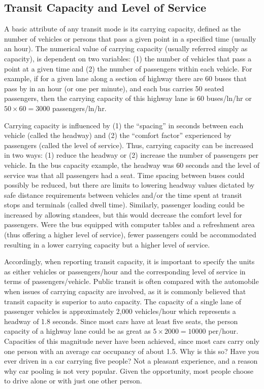 \subsection{Transit Capacity and Level of Service}
A basic attribute of any transit mode is its carrying capacity, defined as the number of vehicles or persons that pass a given point in a specified time (usually an hour). The numerical value of carrying capacity (usually referred simply as capacity), is dependent on two variables: (1) the number of vehicles that pass a point at a given time and (2) the number of passengers within each vehicle. For example, if for a given lane along a section of highway there are 60 buses that pass by in an hour (or one per minute), and each bus carries 50 seated passengers, then the carrying capacity of this highway lane is 60 buses/ln/hr or $50 \times 60 = 3000$ passengers/ln/hr.\\
\par
Carrying capacity is influenced by (1) the “spacing” in seconds between each
vehicle (called the headway) and (2) the “comfort factor” experienced by passengers (called the level of service). Thus, carrying capacity can be increased in two ways: (1) reduce the headway or (2) increase the number of passengers per vehicle. In the bus capacity example, the headway was 60 seconds and the level of service was that all passengers had a seat. Time spacing between buses could possibly be reduced, but there are limits to lowering headway values dictated by safe distance requirements between vehicles and/or the time spent at transit stops and terminals (called dwell time). Similarly, passenger loading could be increased by allowing standees, but this would decrease the comfort level for passengers. Were the bus equipped with computer tables and a refreshment area (thus offering a higher level of service), fewer passengers could be accommodated resulting in a lower carrying capacity but a higher level of service.\\
\par
Accordingly, when reporting transit capacity, it is important to specify the units
as either vehicles or passengers/hour and the corresponding level of service in terms of passengers/vehicle. Public transit is often compared with the automobile when issues of carrying capacity are involved, as it is commonly believed that transit capacity is superior to auto capacity. The capacity of a single lane of passenger vehicles is approximately 2,000 vehicles/hour which represents a headway of 1.8 seconds. Since most cars have at least five seats, the person capacity of a highway lane could be as great as $ 5 \times 2000 = 10000 $ per/hour. Capacities of this magnitude never have been achieved, since most cars carry only one person with an average car occupancy of about 1.5. Why is this so? Have you ever driven in a car carrying five people? Not a pleasant experience, and a reason why car pooling is not very popular. Given the opportunity, most people choose to drive alone or with just one other person.\\
